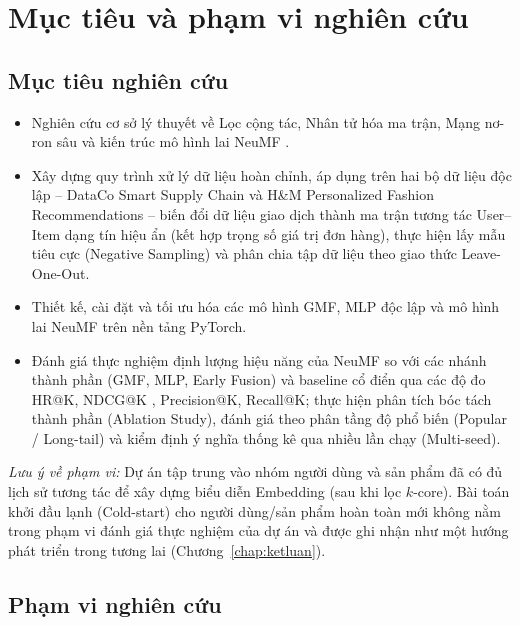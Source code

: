 \section{Mục tiêu và phạm vi nghiên cứu}
\label{sec:muctieu_phamvi}

\subsection{Mục tiêu nghiên cứu}
\label{subsec:muctieu}

\begin{itemize}
    \item Nghiên cứu cơ sở lý thuyết về Lọc cộng tác, Nhân tử hóa ma trận, Mạng nơ-ron sâu và kiến trúc mô hình lai NeuMF \parencite{he2017ncf, koren2009matrix}.
    \item Xây dựng quy trình xử lý dữ liệu hoàn chỉnh, áp dụng trên hai bộ dữ liệu độc lập -- DataCo Smart Supply Chain \parencite{dataco2019} và H\&M Personalized Fashion Recommendations -- biến đổi dữ liệu giao dịch thành ma trận tương tác User--Item dạng tín hiệu ẩn (kết hợp trọng số giá trị đơn hàng), thực hiện lấy mẫu tiêu cực (Negative Sampling) và phân chia tập dữ liệu theo giao thức Leave-One-Out.
    \item Thiết kế, cài đặt và tối ưu hóa các mô hình GMF, MLP độc lập và mô hình lai NeuMF trên nền tảng PyTorch.
    \item Đánh giá thực nghiệm định lượng hiệu năng của NeuMF so với các nhánh thành phần (GMF, MLP, Early Fusion) và baseline cổ điển qua các độ đo HR@K, NDCG@K \parencite{jarvelin2002}, Precision@K, Recall@K; thực hiện phân tích bóc tách thành phần (Ablation Study), đánh giá theo phân tầng độ phổ biến (Popular / Long-tail) và kiểm định ý nghĩa thống kê qua nhiều lần chạy (Multi-seed).
\end{itemize}

\textit{Lưu ý về phạm vi:} Dự án tập trung vào nhóm người dùng và sản phẩm đã có đủ lịch sử tương tác để xây dựng biểu diễn Embedding (sau khi lọc $k$-core). Bài toán khởi đầu lạnh (Cold-start) cho người dùng/sản phẩm hoàn toàn mới không nằm trong phạm vi đánh giá thực nghiệm của dự án và được ghi nhận như một hướng phát triển trong tương lai (Chương~\ref{chap:ketluan}).

\subsection{Phạm vi nghiên cứu}
\label{subsec:phamvi}

